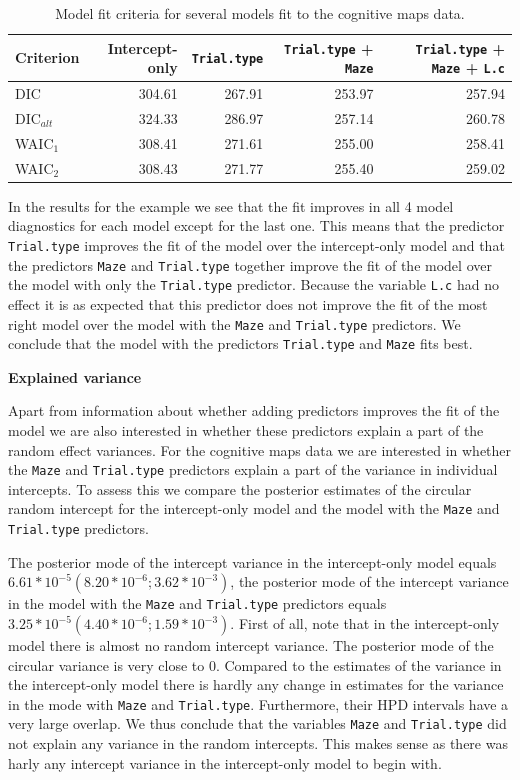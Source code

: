 \documentclass[11pt,]{article}
\begin{document}
\begin{table}
\centering
\caption{Model fit criteria for several models fit to the cognitive maps data.} 
\begin{tabular}{lrrrr}
  \hline\noalign{\smallskip}
 Criterion & Intercept-only & \verb|Trial.type| & \verb|Trial.type| + \verb|Maze| & \verb|Trial.type| + \verb|Maze| + \verb|L.c|  \\ \hline\noalign{\smallskip}
DIC             & 304.61 & 267.91 & 253.97 & 257.94 \\
DIC$_{alt}$     & 324.33 & 286.97 & 257.14 & 260.78 \\
WAIC$_1$        & 308.41 & 271.61 & 255.00 & 258.41 \\
WAIC$_2$        & 308.43 & 271.77 & 255.40 & 259.02 \\
   \hline
\end{tabular}
\label{TableModelFitMaps}
\end{table}

In the results for the example we see that the fit improves in all 4
model diagnostics for each model except for the last one. This means
that the predictor \verb|Trial.type| improves the fit of the model over
the intercept-only model and that the predictors \verb|Maze| and
\verb|Trial.type| together improve the fit of the model over the model
with only the \verb|Trial.type| predictor. Because the variable
\verb|L.c| had no effect it is as expected that this predictor does not
improve the fit of the most right model over the model with the
\verb|Maze| and \verb|Trial.type| predictors. We conclude that the model
with the predictors \verb|Trial.type| and \verb|Maze| fits best.

\textbf{Explained variance}

Apart from information about whether adding predictors improves the fit
of the model we are also interested in whether these predictors explain
a part of the random effect variances. For the cognitive maps data we
are interested in whether the \verb|Maze| and \verb|Trial.type|
predictors explain a part of the variance in individual intercepts. To
assess this we compare the posterior estimates of the circular random
intercept for the intercept-only model and the model with the
\verb|Maze| and \verb|Trial.type| predictors.

The posterior mode of the intercept variance in the intercept-only model
equals \(6.61*10^{-5} (8.20*10^{-6}; 3.62*10^{-3})\), the posterior mode
of the intercept variance in the model with the \verb|Maze| and
\verb|Trial.type| predictors equals
\(3.25*10^{-5} (4.40*10^{-6}; 1.59*10^{-3})\). First of all, note that
in the intercept-only model there is almost no random intercept
variance. The posterior mode of the circular variance is very close to
0. Compared to the estimates of the variance in the intercept-only model
there is hardly any change in estimates for the variance in the mode
with \verb|Maze| and \verb|Trial.type|. Furthermore, their HPD intervals
have a very large overlap. We thus conclude that the variables
\verb|Maze| and \verb|Trial.type| did not explain any variance in the
random intercepts. This makes sense as there was harly any intercept
variance in the intercept-only model to begin with.
\end{document}

